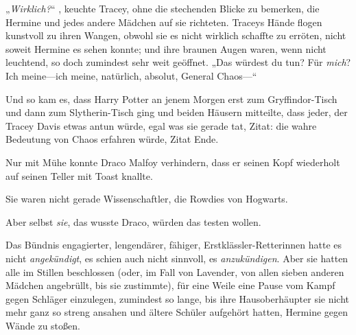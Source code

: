 „\emph{Wirklich?}“ , keuchte Tracey, ohne die stechenden Blicke zu bemerken, die Hermine und jedes andere Mädchen auf sie richteten. Traceys Hände flogen kunstvoll zu ihren Wangen, obwohl sie es nicht wirklich schaffte zu erröten, nicht soweit Hermine es sehen konnte; und ihre braunen Augen waren, wenn nicht leuchtend, so doch zumindest sehr weit geöffnet. „Das würdest du tun? Für \emph{mich}? Ich meine—ich meine, natürlich, absolut, General Chaos—“

\later

Und so kam es, dass Harry Potter an jenem Morgen erst zum Gryffindor-Tisch und dann zum Slytherin-Tisch ging und beiden Häusern mitteilte, dass jeder, der Tracey Davis etwas antun würde, egal was sie gerade tat, Zitat: die wahre Bedeutung von Chaos erfahren würde, Zitat Ende.

Nur mit Mühe konnte Draco Malfoy verhindern, dass er seinen Kopf wiederholt auf seinen Teller mit Toast knallte.

Sie waren nicht gerade Wissenschaftler, die Rowdies von Hogwarts.

Aber selbst \emph{sie}, das wusste Draco, würden das testen wollen.

\later

Das Bündnis engagierter, lengendärer, fähiger, Erstklässler-Retterinnen hatte es nicht \emph{angekündigt}, es schien auch nicht sinnvoll, es \emph{anzukündigen}. Aber sie hatten alle im Stillen beschlossen (oder, im Fall von Lavender, von allen sieben anderen Mädchen angebrüllt, bis sie zustimmte), für eine Weile eine Pause vom Kampf gegen Schläger einzulegen, zumindest so lange, bis ihre Hausoberhäupter sie nicht mehr ganz so streng ansahen und ältere Schüler aufgehört hatten, Hermine gegen Wände zu stoßen.

